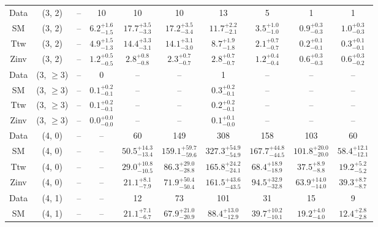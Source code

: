 \begin{table}[h!]
{\begin{tabular}{cccccccccc}
	Data & (3, 2) & -- & 10 & 10 & 10 & 13 & 5 & 1 & 1 \\[0.5ex] 
	SM & (3, 2) & -- & $6.2^{+ 1.6 }_{- 1.5 }$ & $17.7^{+ 3.5 }_{- 3.3 }$ & $17.2^{+ 3.5 }_{- 3.4 }$ & $11.7^{+ 2.2 }_{- 2.1 }$ & $3.5^{+ 1.0 }_{- 1.0 }$ & $0.9^{+ 0.3 }_{- 0.3 }$ & $1.0^{+ 0.3 }_{- 0.3 }$ \\[0.5ex] 
	Ttw & (3, 2) & -- & $4.9^{+ 1.5 }_{- 1.3 }$ & $14.4^{+ 3.3 }_{- 3.1 }$ & $14.1^{+ 3.1 }_{- 3.0 }$ & $8.7^{+ 1.9 }_{- 1.8 }$ & $2.1^{+ 0.7 }_{- 0.7 }$ & $0.2^{+ 0.1 }_{- 0.1 }$ & $0.3^{+ 0.1 }_{- 0.1 }$ \\[0.5ex] 
	Zinv & (3, 2) & -- & $1.2^{+ 0.5 }_{- 0.5 }$ & $2.8^{+ 0.8 }_{- 0.8 }$ & $2.3^{+ 0.7 }_{- 0.7 }$ & $2.8^{+ 0.7 }_{- 0.7 }$ & $1.2^{+ 0.4 }_{- 0.4 }$ & $0.6^{+ 0.3 }_{- 0.3 }$ & $0.6^{+ 0.3 }_{- 0.2 }$ \\[0.5ex] 
	Data & (3, $\ge3$) & -- & 0 & -- & -- & 1 & -- & -- & -- \\[0.5ex] 
	SM & (3, $\ge3$) & -- & $0.1^{+ 0.2 }_{- 0.1 }$ & -- & -- & $0.3^{+ 0.2 }_{- 0.1 }$ & -- & -- & -- \\[0.5ex] 
	Ttw & (3, $\ge3$) & -- & $0.1^{+ 0.2 }_{- 0.1 }$ & -- & -- & $0.2^{+ 0.2 }_{- 0.1 }$ & -- & -- & -- \\[0.5ex] 
	Zinv & (3, $\ge3$) & -- & $0.0^{+ 0.0 }_{- 0.0 }$ & -- & -- & $0.1^{+ 0.1 }_{- 0.0 }$ & -- & -- & -- \\[0.5ex] 
	Data & (4, 0) & -- & -- & 60 & 149 & 308 & 158 & 103 & 60 \\[0.5ex] 
	SM & (4, 0) & -- & -- & $50.5^{+ 14.3 }_{- 13.4 }$ & $159.1^{+ 59.7 }_{- 59.6 }$ & $327.3^{+ 54.9 }_{- 54.9 }$ & $167.7^{+ 44.8 }_{- 44.5 }$ & $101.8^{+ 20.0 }_{- 20.0 }$ & $58.4^{+ 12.1 }_{- 12.1 }$ \\[0.5ex] 
	Ttw & (4, 0) & -- & -- & $29.0^{+ 10.8 }_{- 10.5 }$ & $86.3^{+ 29.0 }_{- 28.8 }$ & $165.8^{+ 24.2 }_{- 24.1 }$ & $68.4^{+ 18.9 }_{- 18.9 }$ & $37.5^{+ 8.9 }_{- 8.8 }$ & $19.2^{+ 5.2 }_{- 5.2 }$ \\[0.5ex] 
	Zinv & (4, 0) & -- & -- & $21.1^{+ 8.1 }_{- 7.9 }$ & $71.9^{+ 50.4 }_{- 50.4 }$ & $161.5^{+ 43.6 }_{- 43.5 }$ & $94.5^{+ 32.9 }_{- 32.8 }$ & $63.9^{+ 14.0 }_{- 14.0 }$ & $39.3^{+ 8.7 }_{- 8.7 }$ \\[0.5ex] 
	Data & (4, 1) & -- & -- & 12 & 73 & 101 & 31 & 15 & 9 \\[0.5ex] 
	SM & (4, 1) & -- & -- & $21.1^{+ 7.1 }_{- 6.7 }$ & $67.9^{+ 21.0 }_{- 20.9 }$ & $88.4^{+ 13.0 }_{- 12.9 }$ & $39.7^{+ 10.2 }_{- 10.1 }$ & $19.2^{+ 4.0 }_{- 4.0 }$ & $12.4^{+ 2.8 }_{- 2.8 }$ \\[0.5ex] 

\end{tabular}}
\end{table}
